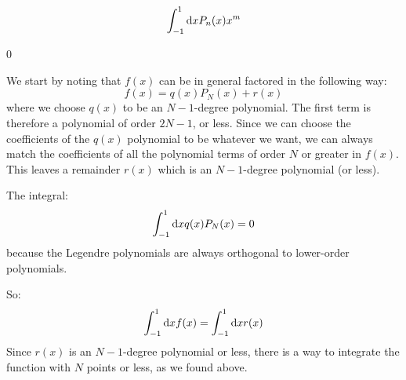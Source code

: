   
  \begin{equation}
    \int_{-1}^{1} {\rm d}x P_{n}(x) x^m 
  \end{equation}
  
  \begin{answer}
    0
  \end{answer}

We start by noting that $f(x)$  can be in general factored in the
following way:
\begin{equation}
f(x) = q(x) P_N(x) + r(x)
\end{equation}
where we choose $q(x)$ to be an $N-1$-degree polynomial. The first
term is therefore a polynomial of order $2N-1$, or less. Since we can
choose the coefficients of the $q(x)$ polynomial to be whatever we
want, we can always match the coefficients of all the polynomial terms
of order $N$ or greater in $f(x)$. This leaves a remainder $r(x)$
which is an $N-1$-degree polynomial (or less).

The integral:
\begin{equation}
\int_{-1}^{1} {\rm d}x q(x) P_N(x) = 0
\end{equation}
because the Legendre polynomials are always orthogonal to lower-order
polynomials.

So:
\begin{equation}
\int_{-1}^{1} {\rm d}x f(x) = \int_{-1}^{1} {\rm d}x r(x)
\end{equation}
Since $r(x)$ is an $N-1$-degree polynomial or less, there is a way to
integrate the function with $N$ points or less, as we found above.

